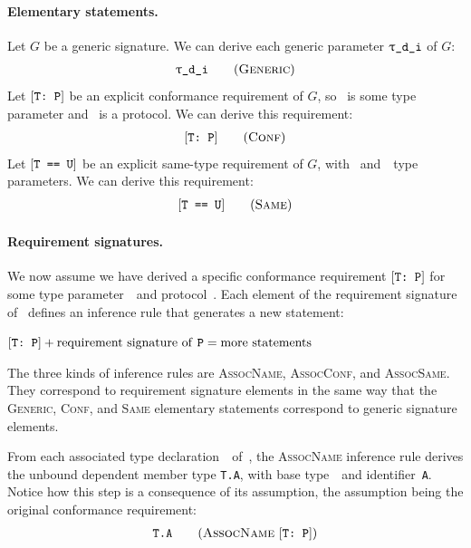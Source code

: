 \documentclass[../generics]{subfiles}
\begin{document}
\paragraph{Elementary statements.}
Let $G$ be a generic signature. We can derive each generic parameter $\ttgp{d}{i}$ of $G$:
\begin{gather*}
\GenericStepDef
\end{gather*}
Let $[\texttt{T:~P}]$ be an explicit conformance requirement of $G$, so \tT\ is some type parameter and \tP\ is a protocol. We can derive this requirement:
\begin{gather*}
\ConfStepDef
\end{gather*}
Let $[\texttt{T == U}]$ be an explicit same-type requirement of $G$, with \tT~and~\tU\ type parameters. We can derive this requirement:
\begin{gather*}
\SameStepDef
\end{gather*}

\paragraph{Requirement signatures.}
We now assume we have derived a specific conformance requirement $[\texttt{T:~P}]$ for some type parameter~\tT\ and protocol~\tP. Each element of the requirement signature of \tP\ defines an inference rule that generates a new statement:
\begin{center}
$[\texttt{T:~P}] + \text{requirement signature of \texttt{P}} = \text{more statements}$
\end{center}
The three kinds of inference rules are \textsc{AssocName}, \textsc{AssocConf}, and \textsc{AssocSame}. They correspond to requirement signature elements in the same way that the \textsc{Generic}, \textsc{Conf}, and \textsc{Same} elementary statements correspond to generic signature elements.

From each associated type declaration~\nA\ of~\tP, the \textsc{AssocName} inference rule derives the unbound dependent member type \texttt{T.A}, with base type~\tT\ and identifier~\texttt{A}. Notice how this step is a consequence of its assumption, the assumption being the original conformance requirement:
\begin{gather*}
\AssocNameStepDef
\end{gather*}
\end{document}
